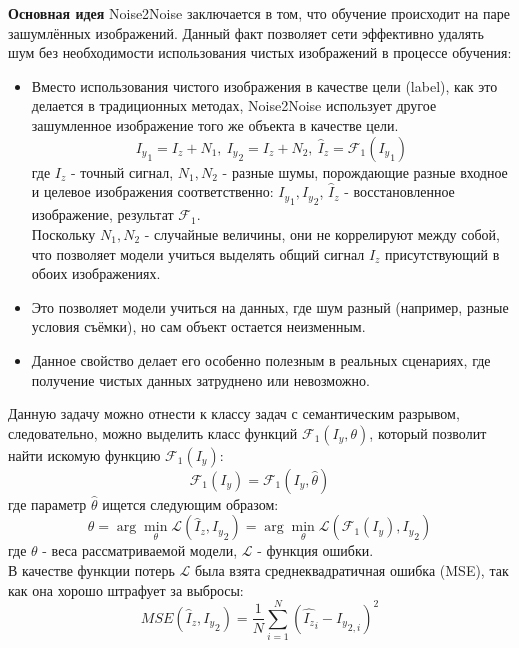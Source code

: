 \par \textbf{Основная идея} Noise2Noise заключается в том, что обучение происходит на паре зашумлённых изображений. Данный факт позволяет сети эффективно удалять шум без необходимости использования чистых изображений в процессе обучения:
\begin{itemize}[]
	\item Вместо использования чистого изображения в качестве цели (label), как это делается в традиционных методах, Noise2Noise использует другое зашумленное изображение того же объекта в качестве цели.
	\begin{equation}
		{I_y}_1 = I_z + N_1,\
		{I_y}_2 = I_z + N_2,\
		\hat I_z = \mathscr{F}_1({I_y}_1)
	\end{equation}
	где $I_z$ - точный сигнал, $N_1, N_2$ - разные шумы, порождающие разные входное и целевое изображения соответственно: ${I_y}_1, {I_y}_2$, $\hat I_z$ - восстановленное изображение, результат $\mathscr{F}_1$.\\
	Поскольку $N_1, N_2$ - случайные величины, они не коррелируют между собой, что позволяет модели учиться выделять общий сигнал $I_z$ присутствующий в обоих изображениях.
	\item Это позволяет модели учиться на данных, где шум разный (например, разные условия съёмки), но сам объект остается неизменным.
	\item Данное свойство делает его особенно полезным в реальных сценариях, где получение чистых данных затруднено или невозможно.
\end{itemize}
\par Данную задачу можно отнести к классу задач с семантическим
разрывом, следовательно, можно выделить класс функций $\mathscr{F}_1(I_y, \theta)$, который позволит найти искомую функцию $\mathscr{F}_1(I_y)$:
\begin{equation}
	\mathscr{F}_1(I_y) = \mathscr{F}_1(I_y, \hat \theta)
\end{equation} где параметр $\hat \theta$ ищется следующим образом:
\begin{equation}
	\hat\theta = \arg\min_{\theta}\mathscr{L}(\hat I_z, {I_y}_2) = \arg\min_{\theta}\mathscr{L}(\mathscr{F}_1(I_y), {I_y}_2)
\end{equation}
где $\theta$ - веса рассматриваемой модели, $\mathscr{L}$ - функция ошибки.\\
В качестве функции потерь $\mathscr{L}$ была взята среднеквадратичная ошибка (MSE), так как она хорошо штрафует за выбросы:\\
\begin{equation}
	MSE(\hat I_z, {I_y}_2) = \frac{1}{N}\sum_{i=1}^{N}(\hat {I_z}_i - {I_y}_{2,i})^2
\end{equation}
